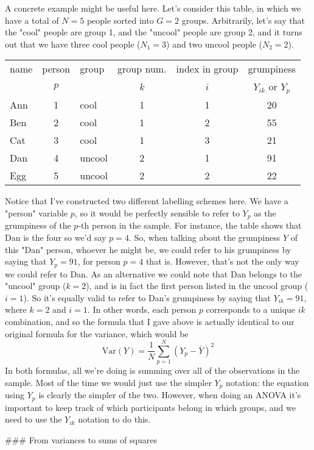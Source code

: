 A concrete example might be useful here. Let's consider this table, in which we have a total of $N=5$ people sorted into $G=2$ groups. Arbitrarily, let's say that the "cool" people are group 1, and the "uncool" people are group 2, and it turns out that we have three cool people ($N_1 = 3$) and two uncool people ($N_2 = 2$).
\begin{center}
\begin{tabular}{lclccc} \hline 
name & person & group & group num. & index in group & grumpiness \\
& $p$ &          & $k$ & $i$ & $Y_{ik}$ or $Y_p$ \\ \hline
Ann & 1 & cool   &  1  &  1  & 20 \\
Ben & 2 & cool   &  1  &  2  & 55\\
Cat & 3 & cool   &  1  &  3  & 21\\
Dan & 4 & uncool &  2  &  1  & 91\\
Egg & 5 & uncool &  2  &  2  & 22\\
\end{tabular}
\end{center}
Notice that I've constructed two different labelling schemes here. We have a "person" variable $p$, so it would be perfectly sensible to refer to $Y_p$ as the grumpiness of the $p$-th person in the sample. For instance, the table shows that Dan is the four so we'd say $p = 4$. So, when talking about the grumpiness $Y$ of this "Dan" person, whoever he might be, we could refer to his grumpiness by saying that $Y_p = 91$, for person $p = 4$ that is.  However, that's not the only way we could refer to Dan. As an alternative we could note that Dan belongs to the "uncool" group ($k = 2$), and is in fact the first person listed in the uncool group ($i = 1$). So it's equally valid to refer to Dan's grumpiness by saying that $Y_{ik} = 91$, where $k = 2$ and $i = 1$. In other words, each person $p$ corresponds to a unique $ik$ combination, and so the formula that I gave above is actually identical to our original formula for the variance, which would be
$$
\mbox{Var}(Y) = \frac{1}{N} \sum_{p=1}^N  \left(Y_{p} - \bar{Y} \right)^2
$$
In both formulas, all we're doing is summing over all of the observations in the sample. Most of the time we would just use the simpler $Y_p$ notation: the equation using $Y_p$ is clearly the simpler of the two. However, when doing an ANOVA it's important to keep track of which participants belong in which groups, and we need to use the $Y_{ik}$ notation to do this. 


### From variances to sums of squares

